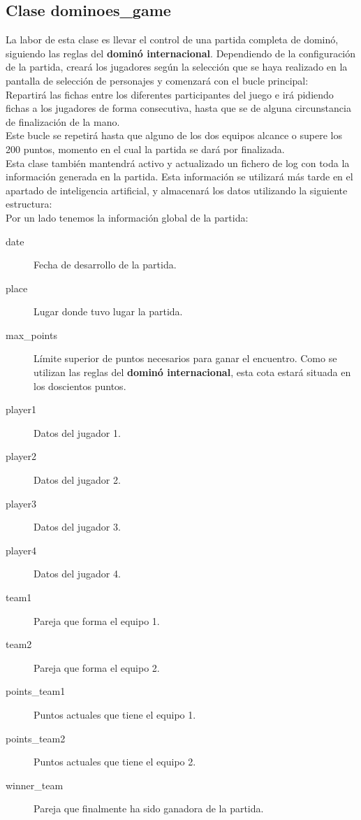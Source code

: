 \subsection{Clase dominoes\_game}

La labor de esta clase es llevar el control de una partida completa de dominó, siguiendo las reglas del \textbf{dominó
internacional}. Dependiendo de la configuración de la partida, creará los jugadores según la selección que se haya
realizado en la pantalla de selección de personajes y comenzará con el bucle principal: \\

Repartirá las fichas entre los diferentes participantes del juego e irá pidiendo fichas a los jugadores de forma
consecutiva, hasta que se de alguna circunstancia de finalización de la mano. \\

Este bucle se repetirá hasta que alguno de los dos equipos alcance o supere los 200 puntos, momento en el cual la partida
se dará por finalizada. \\

Esta clase también mantendrá activo y actualizado un fichero de log con toda la información generada en la partida. Esta
información se utilizará más tarde en el apartado de inteligencia artificial, y almacenará los datos utilizando
la siguiente estructura: \\

Por un lado tenemos la información global de la partida: 

\begin{description}
    \item[date] Fecha de desarrollo de la partida.
    \item[place] Lugar donde tuvo lugar la partida.
    \item[max\_points] Límite superior de puntos necesarios para ganar el encuentro. Como se utilizan las reglas del
        \textbf{dominó internacional}, esta cota estará situada en los doscientos puntos.
    \item[player1] Datos del jugador 1.
    \item[player2] Datos del jugador 2.
    \item[player3] Datos del jugador 3.
    \item[player4] Datos del jugador 4.
    \item[team1] Pareja que forma el equipo 1.
    \item[team2] Pareja que forma el equipo 2.
    \item[points\_team1] Puntos actuales que tiene el equipo 1.
    \item[points\_team2] Puntos actuales que tiene el equipo 2.
    \item[winner\_team] Pareja que finalmente ha sido ganadora de la partida.
\end{description}

